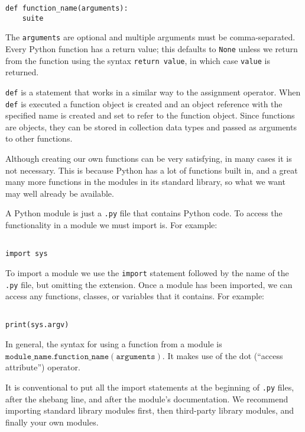 \begin{tcolorbox}
\begin{verbatim}
def function_name(arguments):
    suite
\end{verbatim}
\end{tcolorbox}

The \verb|arguments| are optional and multiple arguments must be comma-separated.
Every Python function has a return value; this defaults to \verb|None| unless we return from the function using the syntax \verb|return value|, in which case \verb|value| is returned.



\verb|def| is a statement that works in a similar way to the assignment operator.
When \verb|def| is executed a function object is created and an object reference with the specified name is created and set to refer to the function object.
Since functions are objects, they can be stored in collection data types and passed as arguments to other functions.



Although creating our own functions can be very satisfying, in many cases it is not necessary.
This is because Python has a lot of functions built in, and a great many more functions in the modules in its standard library, so what we want may well already be available.


A Python module is just a \verb|.py| file that contains Python code.
To access the functionality in a module we must import is.
For example:
\begin{lstlisting}

import sys
\end{lstlisting}



To import a module we use the \verb|import| statement followed by the name of the \verb|.py| file, but omitting the extension.
Once a module has been imported, we can access any functions, classes, or variables that it contains. For example:

\begin{lstlisting}

print(sys.argv)
\end{lstlisting}




In general, the syntax for using a function from a module is \\
$\mathtt{module\_name.function\_name(arguments)}$.
It makes use of the dot (“access attribute”) operator.




It is conventional to put all the import statements at the beginning of \verb|.py| files, after the shebang line, and after the module’s documentation.
We recommend importing standard library modules first, then third-party library modules, and finally your own modules.
